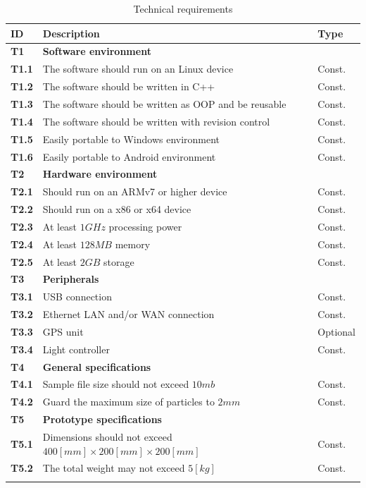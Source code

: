 \documentclass[11pt,fleqn,,a4paper,twoside,openright]{book}
\begin{document}
\begin{longtable}{|p{1cm}| p{10cm} p{1.5cm}|}
\hline
\textbf{ID} & \textbf{Description} & \textbf{Type} \\
\endhead
\hline
\textbf{T1}\label{T1} & \textbf{Software environment} &  \\
\hline
\textbf{T1.1}\label{T1.1} & The software should run on an Linux device & Const. \\
\hline
\textbf{T1.2}\label{T1.2} & The software should be written in C++ & Const. \\
\hline
\textbf{T1.3}\label{T1.3} & The software should be written as OOP and be reusable & Const. \\
\hline
\textbf{T1.4}\label{T1.4} & The software should be written with revision control & Const. \\
\hline
\textbf{T1.5}\label{T1.5} & Easily portable to Windows environment & Const. \\
\hline
\textbf{T1.6}\label{T1.6} & Easily portable to Android environment & Const. \\
\hline
\textbf{T2}\label{T2} & \textbf{Hardware environment} &  \\
\hline
\textbf{T2.1}\label{T2.1} & Should run on an ARMv7 or higher device &  Const. \\
\hline
\textbf{T2.2}\label{T2.2} & Should run on a x86 or x64 device & Const. \\
\hline
\textbf{T2.3}\label{T2.3} & At least $1 GHz$ processing power & Const. \\
\hline
\textbf{T2.4}\label{T2.4} & At least $128 MB$ memory & Const. \\
\hline
\textbf{T2.5}\label{T2.5} & At least $2 GB$ storage & Const. \\
\hline
\textbf{T3}\label{T3} & \textbf{Peripherals}  &  \\
\hline
\textbf{T3.1}\label{T3.1} & USB connection  & Const. \\
\hline
\textbf{T3.2}\label{T3.2} & Ethernet LAN and/or WAN connection  & Const. \\
\hline
\textbf{T3.3}\label{T3.3} & GPS unit & Optional  \\
\hline
\textbf{T3.4}\label{T3.4} & Light controller & Const. \\
\hline
\textbf{T4}\label{T4} & \textbf{General specifications} &  \\
\hline
\textbf{T4.1}\label{T4.1} & Sample file size should not exceed $ 10 mb $ & Const. \\
\hline
\textbf{T4.2}\label{T4.2} & Guard the maximum size of particles to $ 2 mm $ & Const. \\
\hline
\textbf{T5}\label{T5} & \textbf{Prototype specifications} &  \\
\hline
\textbf{T5.1}\label{T5.1} & Dimensions should not exceed $ 400[mm] \times 200[mm] \times 200[mm] $ & Const. \\
\hline
\textbf{T5.2}\label{T5.2} & The total weight may not exceed $ 5[kg] $ & Const. \\
\hline
\caption{Technical requirements}\label{tab:TechReq}
\end{longtable}
\end{document}
